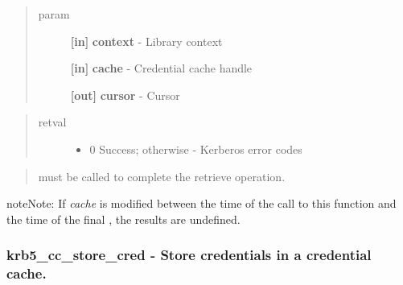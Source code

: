 \documentclass[letterpaper,10pt,english]{sphinxmanual}
\begin{document}
\begin{quote}\begin{description}
\item[{param}] \leavevmode
\textbf{{[}in{]}} \textbf{context} - Library context

\textbf{{[}in{]}} \textbf{cache} - Credential cache handle

\textbf{{[}out{]}} \textbf{cursor} - Cursor

\end{description}\end{quote}
\begin{quote}\begin{description}
\item[{retval}] \leavevmode\begin{itemize}
\item {} 
0   Success; otherwise - Kerberos error codes

\end{itemize}

\end{description}\end{quote}
\begin{quote}

{\hyperref[appdev/refs/api/krb5_cc_end_seq_get:krb5_cc_end_seq_get]{}} must be called to complete the retrieve operation.
\end{quote}

\begin{notice}{note}{Note:}
If \emph{cache} is modified between the time of the call to this function and the time of the final {\hyperref[appdev/refs/api/krb5_cc_end_seq_get:krb5_cc_end_seq_get]{}} , the results are undefined.
\end{notice}


\subsubsection{krb5\_cc\_store\_cred -  Store credentials in a credential cache.}
\label{appdev/refs/api/krb5_cc_store_cred:krb5-cc-store-cred-store-credentials-in-a-credential-cache}\label{appdev/refs/api/krb5_cc_store_cred::doc}

\begin{fulllineitems}
\label{appdev/refs/api/krb5_cc_store_cred:krb5_cc_store_cred}
\end{fulllineitems}
\end{document}
